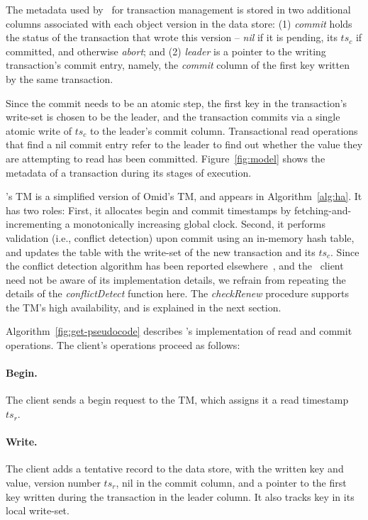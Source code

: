 The metadata used by \sys\ for transaction management is stored in two additional columns associated with each object version in the data store:
(1) \emph{commit} holds the status of the transaction that wrote this version -- \emph{nil} if it is pending, its  $ts_c$ if committed, and 
otherwise \emph{abort}; 
and
(2) \emph{leader} is a pointer to the writing transaction's commit entry, namely, the \emph{commit} column of the first key written by the same
transaction. 

Since the commit needs to be an atomic step, the first key in the transaction's write-set is chosen to be the leader, and the transaction commits via a single atomic write of $ts_c$ to the leader's commit column. Transactional read operations that find a nil commit entry 
refer to the leader to find out whether the value they are attempting to read has been committed.
Figure~\ref{fig:model} shows the metadata of a transaction during its stages of execution. 

\sys's TM is a simplified version of Omid's TM, and appears  in Algorithm~\ref{alg:ha}. It has two roles:
First, it allocates begin and commit timestamps by fetching-and-incrementing a monotonically increasing global clock.
Second, it performs validation (i.e., conflict detection) upon commit using an in-memory hash table, 
and updates the table with the write-set of the new transaction and its $ts_c$. 
Since the conflict detection algorithm has been reported elsewhere~\cite{Omid2017}, and the \sys\ client need not be aware of 
its implementation details, we refrain from repeating the details of the \emph{conflictDetect} function here. 
The  \emph{checkRenew} procedure supports the TM's  high availability, and is explained in the next section.

Algorithm~\ref{fig:get-pseudocode} describes \sys's implementation of read and commit operations.
The client's operations proceed as follows:

\paragraph{Begin.}
The client sends a begin request to the TM, which assigns it a read timestamp $ts_r$.

\paragraph{Write.}
The client adds a tentative record to the data store, with the written key and value, version number $ts_r$, 
nil in the commit column, and a pointer to the first key written during the transaction in the leader column.
It also tracks key in its local write-set.


